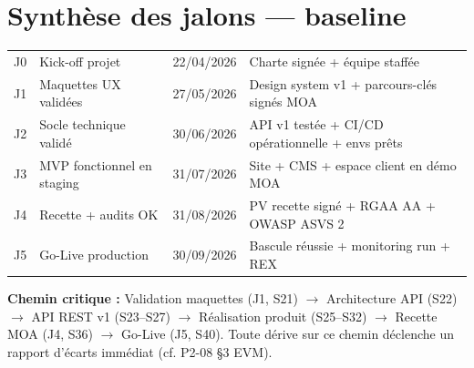 \documentclass[11pt,a4paper,oneside]{report}
\begin{document}
\section*{Synthèse des jalons --- baseline}

\renewcommand{\arraystretch}{1.4}
\begin{tabularx}{\textwidth}{C{1.2cm} L{4.5cm} L{3cm} Y}
\toprule
{} &  &  &  \\
\midrule
J0 & Kick-off projet            & 22/04/2026 & Charte signée + équipe staffée \\
J1 & Maquettes UX validées      & 27/05/2026 & Design system v1 + parcours-clés signés MOA \\
J2 & Socle technique validé     & 30/06/2026 & API v1 testée + CI/CD opérationnelle + envs prêts \\
J3 & MVP fonctionnel en staging & 31/07/2026 & Site + CMS + espace client en démo MOA \\
J4 & Recette + audits OK        & 31/08/2026 & PV recette signé + RGAA AA + OWASP ASVS 2 \\
J5 & Go-Live production         & 30/09/2026 & Bascule réussie + monitoring run + REX \\
\bottomrule
\end{tabularx}

\vspace{4pt}
\begin{alert}
\textbf{Chemin critique :} Validation maquettes (J1, S21) $\rightarrow$ Architecture API (S22) $\rightarrow$ API REST v1 (S23--S27) $\rightarrow$ Réalisation produit (S25--S32) $\rightarrow$ Recette MOA (J4, S36) $\rightarrow$ Go-Live (J5, S40). Toute dérive sur ce chemin déclenche un rapport d'écarts immédiat (cf. P2-08 §3 EVM).
\end{alert}
\end{document}
